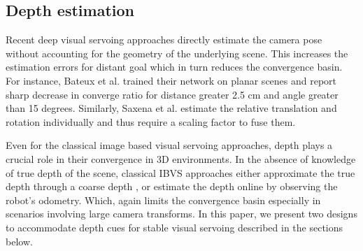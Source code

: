 \documentclass[letterpaper, 10 pt, conference]{ieeeconf}  %
\begin{document}
\subsection{Depth estimation}
Recent deep visual servoing approaches directly estimate the camera pose without accounting for the geometry of the underlying scene. This increases the estimation errors for distant goal which in turn reduces the convergence basin. For instance, Bateux et al. \cite{trainingdeepvs} trained their network on planar scenes and report sharp decrease in converge ratio for distance greater 2.5 cm and angle greater than 15 degrees. Similarly, Saxena et al. \cite{photometricvs} estimate the relative translation and rotation individually and thus require a scaling factor to fuse them.

\indent Even for the classical image based visual servoing approaches, depth plays a crucial role in their convergence in 3D environments. In the absence of knowledge of true depth of the scene, classical IBVS approaches either approximate the true depth through a coarse depth \cite{vsbasic}, or estimate the depth online \cite{onlinedepth} by observing the robot's odometry. Which, again limits the convergence basin especially in scenarios involving large camera transforms. In this paper, we present two designs to accommodate depth cues for stable visual servoing described in the sections below.
\end{document}
